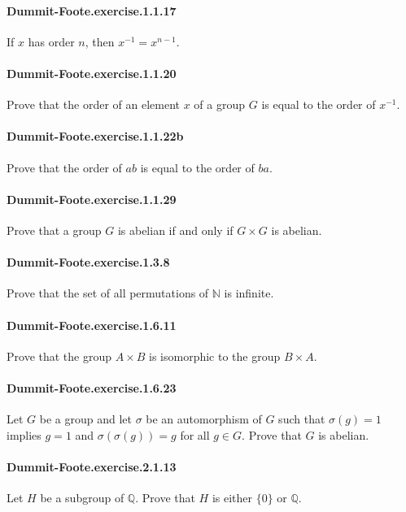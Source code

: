 \documentclass{article}
\begin{document}
\paragraph{Dummit-Foote.exercise.1.1.17} If $x$ has order $n$, then $x^{-1}=x^{n-1}$.

\paragraph{Dummit-Foote.exercise.1.1.20} Prove that the order of an element $x$ of a group $G$ is equal to the order of $x^{-1}$.

\paragraph{Dummit-Foote.exercise.1.1.22b} Prove that the order of $ab$ is equal to the order of $ba$.

\paragraph{Dummit-Foote.exercise.1.1.29} Prove that a group $G$ is abelian if and only if $G\times G$ is abelian.

\paragraph{Dummit-Foote.exercise.1.3.8} Prove that the set of all permutations of $\mathbb{N}$ is infinite.

\paragraph{Dummit-Foote.exercise.1.6.11} Prove that the group $A\times B$ is isomorphic to the group $B\times A$.

\paragraph{Dummit-Foote.exercise.1.6.23} Let $G$ be a group and let $\sigma$ be an automorphism of $G$ such that $\sigma(g)=1$ implies $g=1$ and $\sigma(\sigma(g))=g$ for all $g\in G$. Prove that $G$ is abelian.

\paragraph{Dummit-Foote.exercise.2.1.13} Let $H$ be a subgroup of $\mathbb{Q}$. Prove that $H$ is either $\{0\}$ or $\mathbb{Q}$.
\end{document}
